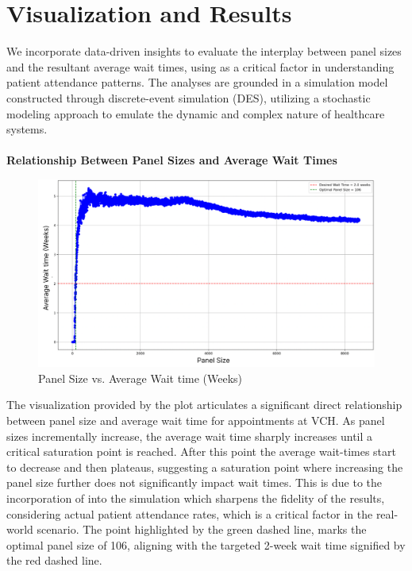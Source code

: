 \documentclass[11pt]{article}
\theoremstyle{definition}
\begin{document}
\section{Visualization and Results}

We incorporate data-driven insights to evaluate the interplay between panel sizes and the resultant average wait times, using  as a critical factor in understanding patient attendance patterns. The analyses are grounded in a simulation model constructed through discrete-event simulation (DES), utilizing a stochastic modeling approach to emulate the dynamic and complex nature of healthcare systems.\\\\
\textbf{Relationship Between Panel Sizes and Average Wait Times}

\begin{figure}[H]
    \centering
    \includegraphics[width=1\textwidth]{sim1run.png}
    \caption{Panel Size vs. Average Wait time (Weeks)}
    \label{fig:show_rate}
\end{figure}

The visualization provided by the plot articulates a significant direct relationship between panel size and average wait time for appointments at VCH. As panel sizes incrementally increase, the average wait time sharply increases until a critical saturation point is reached. After this point the average wait-times start to decrease and then plateaus, suggesting a saturation point where increasing the panel size further does not significantly impact wait times. This is due to the incorporation of  into the simulation which sharpens the fidelity of the results, considering actual patient attendance rates, which is a critical factor in the real-world scenario.
The point highlighted by the green dashed line, marks the optimal panel size of 106, aligning with the targeted 2-week wait time signified by the red dashed line. 
\end{document}
